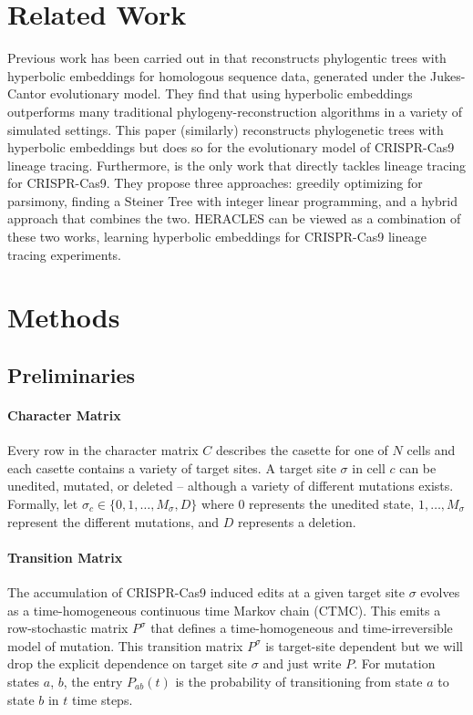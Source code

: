 \documentclass{article}
\begin{document}
\section{Related Work}


Previous work has been carried out in \cite{wilson2021learning} that reconstructs phylogentic trees with hyperbolic embeddings for homologous sequence data, generated under the Jukes-Cantor evolutionary model. They find that using hyperbolic embeddings outperforms many traditional phylogeny-reconstruction algorithms in a variety of simulated settings. This paper (similarly) reconstructs phylogenetic trees with hyperbolic embeddings but does so for the evolutionary model of CRISPR-Cas9 lineage tracing. Furthermore, \cite{jones2020inference} is the only work that directly tackles lineage tracing for CRISPR-Cas9. They propose three approaches: greedily optimizing for parsimony, finding a Steiner Tree with integer linear programming, and a hybrid approach that combines the two. HERACLES can be viewed as a combination of these two works, learning hyperbolic embeddings for CRISPR-Cas9 lineage tracing experiments.


\section{Methods}


\subsection{Preliminaries}

\paragraph*{Character Matrix} Every row in the character matrix $C$ describes the casette for one of $N$ cells and each casette contains a variety of target sites. A target site $\sigma$ in cell $c$ can be unedited, mutated, or deleted -- although a variety of different mutations exists. Formally, let $\sigma_c \in \{0, 1, \ldots, M_\sigma, D \}$ where $0$ represents the unedited state, $1, \ldots, M_\sigma$ represent the different mutations, and $D$ represents a deletion.

\paragraph*{Transition Matrix} The accumulation of CRISPR-Cas9 induced edits at a given target site $\sigma$ evolves as a time-homogeneous continuous time Markov chain (CTMC). This emits a row-stochastic matrix $P^\sigma$ that defines a time-homogeneous and time-irreversible model of mutation. This transition matrix $P^\sigma$ is target-site dependent but we will drop the explicit dependence on target site $\sigma$ and just write $P$. For mutation states $a$, $b$, the entry $P_{ab}(t)$ is the probability of transitioning from state $a$ to state $b$ in $t$ time steps.
\end{document}
